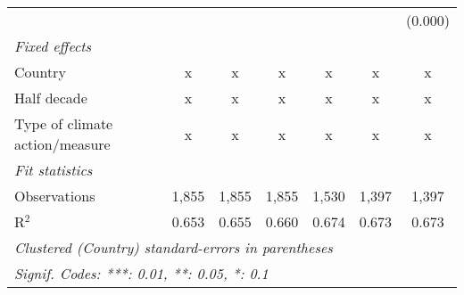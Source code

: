 \begin{tabular}{lcccccc}
                                                   &         &              &                &                &                & (0.000)\\   
   \emph{Fixed effects}\\
   Country                                         & x       & x            & x              & x              & x              & x\\  
   Half decade                                     & x       & x            & x              & x              & x              & x\\  
   Type of climate action/measure                  & x       & x            & x              & x              & x              & x\\  
   \midrule \emph{Fit statistics}\\
   Observations                                    & 1,855   & 1,855        & 1,855          & 1,530          & 1,397          & 1,397\\  
   R$^2$                                           & 0.653   & 0.655        & 0.660          & 0.674          & 0.673          & 0.673\\  
   \midrule
   \multicolumn{7}{l}{\emph{Clustered (Country) standard-errors in parentheses}}\\
   \multicolumn{7}{l}{\emph{Signif. Codes: ***: 0.01, **: 0.05, *: 0.1}}\\
\end{tabular}
\par\endgroup



